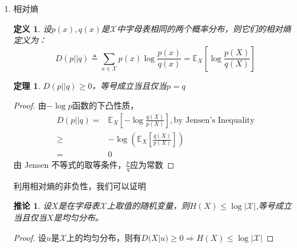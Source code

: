 \documentclass{article}
\newtheorem{definition}{定义}
\newtheorem{thm}{定理}
\newtheorem{cor}{推论}
\def\E{\mathbb{E}}
\begin{document}
\begin{enumerate}
关系式：
\begin{itemize}
\item $H(X,Y)=H(X)+H(Y|X)=H(Y)+H(X|Y)$
\begin{proof}
\begin{align*}
H(X,Y)= & -\sum_{x\in \mathcal{X},y\in \mathcal{Y}} p(x,y)\log p(x,y)\\
= & -\sum_{x\in \mathcal{X},y\in \mathcal{Y}} [p(x,y)\log p(y|X=x)+p(x,y)\log p(x)]\\
= & -\sum_{x\in \mathcal{X},y\
in \mathcal{Y}} p(x,y)\log p(y|X=x)-\sum_{x\in \mathcal{X}} p(x)\log p(x)\\
= & H(Y|X)+H(X)
\end{align*}
\end{proof}
\item 记$H(X_1 | X_0)=H(X_1)$,则有
$$
H(X_1,\dots,X_n)=\sum_{i=1}^n H(X_i | X_1,\dots, X_{i-1})
$$
\end{itemize}
\item 相对熵
\begin{definition}
设$p(x),q(x)$是$\mathcal{X}$中字母表相同的两个概率分布，则它们的相对熵定义为：
$$
D(p||q)\triangleq \sum_{x\in \mathcal{X}} p(x)\log\frac{p(x)}{q(x)}
= \E_X[\log\frac{p(X)}{q(X)}]
$$
\end{definition}
\begin{thm}
$D(p||q)\geq 0$，等号成立当且仅当$p=q$
\end{thm}
\begin{proof}
由$-\log p$函数的下凸性质，
\begin{align*}
D(p||q) =& \E_{X}[ -\log\frac{q(X)}{p(X)}],\text{by Jensen's Inequality} \\
\geq &  -\log\left(\E_{X} [\frac{q(X)}{p(X)}]\right)\\
= & 0
\end{align*}
由 Jensen 不等式的取等条件，$\frac{p}{q}$应为常数
\end{proof}
利用相对熵的非负性，我们可以证明
\begin{cor}
设$X$是在字母表$\mathcal{X}$上取值的随机变量，则$H(X)\leq \log|\mathcal{X}|$,等号成立当且仅当$X$是均匀分布。
\end{cor}
\begin{proof}
设$u$是$\mathcal{X}$上的均匀分布，则有$D(X|u)\geq 0 \Rightarrow H(X)\leq \log|\mathcal{X}|$
\end{proof}


\end{enumerate}
\end{document}
